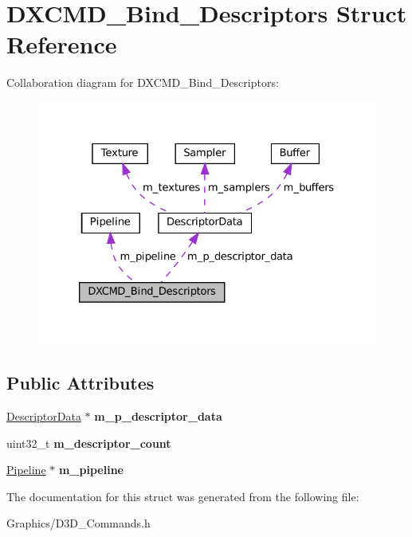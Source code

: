 \hypertarget{structDXCMD__Bind__Descriptors}{}\section{D\+X\+C\+M\+D\+\_\+\+Bind\+\_\+\+Descriptors Struct Reference}
\label{structDXCMD__Bind__Descriptors}


Collaboration diagram for D\+X\+C\+M\+D\+\_\+\+Bind\+\_\+\+Descriptors\+:
\nopagebreak
\begin{figure}[H]
\begin{center}
\leavevmode
\includegraphics[width=326pt]{structDXCMD__Bind__Descriptors__coll__graph}
\end{center}
\end{figure}
\subsection*{Public Attributes}
\begin{DoxyCompactItemize}
\item 
\mbox{\label{structDXCMD__Bind__Descriptors_ab808f8e26d8c2495c59224a2c158bc00}} 
\hyperlink{structDescriptorData}{Descriptor\+Data} $\ast$ {\bfseries m\+\_\+p\+\_\+descriptor\+\_\+data}
\item 
\mbox{\label{structDXCMD__Bind__Descriptors_a407211335edb3c34376799061a184a33}} 
uint32\+\_\+t {\bfseries m\+\_\+descriptor\+\_\+count}
\item 
\mbox{\label{structDXCMD__Bind__Descriptors_aea942ffd2e4c6e0d1cfaa8c782f9e092}} 
\hyperlink{classPipeline}{Pipeline} $\ast$ {\bfseries m\+\_\+pipeline}
\end{DoxyCompactItemize}


The documentation for this struct was generated from the following file\+:\begin{DoxyCompactItemize}
\item 
Graphics/D3\+D\+\_\+\+Commands.\+h\end{DoxyCompactItemize}
